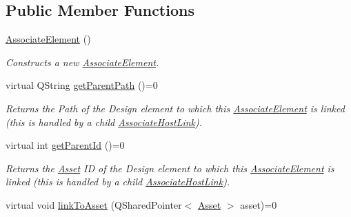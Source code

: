 \subsection*{Public Member Functions}
\begin{DoxyCompactItemize}
\item 
\hyperlink{class_picto_1_1_associate_element_a14c5e420883077b0caff95e78e1d6b0e}{Associate\-Element} ()
\begin{DoxyCompactList}\small\item\em Constructs a new \hyperlink{class_picto_1_1_associate_element}{Associate\-Element}. \end{DoxyCompactList}\item 
\hypertarget{class_picto_1_1_associate_element_a5a314290803f960fefceae3b4f15ca0d}{virtual Q\-String \hyperlink{class_picto_1_1_associate_element_a5a314290803f960fefceae3b4f15ca0d}{get\-Parent\-Path} ()=0}\label{class_picto_1_1_associate_element_a5a314290803f960fefceae3b4f15ca0d}

\begin{DoxyCompactList}\small\item\em Returns the Path of the Design element to which this \hyperlink{class_picto_1_1_associate_element}{Associate\-Element} is linked (this is handled by a child \hyperlink{class_picto_1_1_associate_host_link}{Associate\-Host\-Link}). \end{DoxyCompactList}\item 
\hypertarget{class_picto_1_1_associate_element_aa1fc2664524857690434268d23383e85}{virtual int \hyperlink{class_picto_1_1_associate_element_aa1fc2664524857690434268d23383e85}{get\-Parent\-Id} ()=0}\label{class_picto_1_1_associate_element_aa1fc2664524857690434268d23383e85}

\begin{DoxyCompactList}\small\item\em Returns the \hyperlink{class_picto_1_1_asset}{Asset} I\-D of the Design element to which this \hyperlink{class_picto_1_1_associate_element}{Associate\-Element} is linked (this is handled by a child \hyperlink{class_picto_1_1_associate_host_link}{Associate\-Host\-Link}). \end{DoxyCompactList}\item 
\hypertarget{class_picto_1_1_associate_element_a8ef5f864d782c1d07772cbb6d585dd11}{virtual void \hyperlink{class_picto_1_1_associate_element_a8ef5f864d782c1d07772cbb6d585dd11}{link\-To\-Asset} (Q\-Shared\-Pointer$<$ \hyperlink{class_picto_1_1_asset}{Asset} $>$ asset)=0}\label{class_picto_1_1_associate_element_a8ef5f864d782c1d07772cbb6d585dd11}


\end{DoxyCompactItemize}
